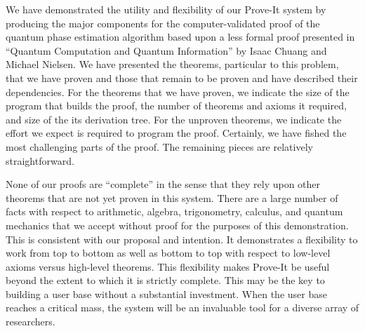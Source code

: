 \documentclass{article}[12pt]
\begin{document}
We have demonstrated the utility and flexibility of our Prove-It system by producing the major components for the computer-validated proof of the quantum phase estimation algorithm based upon a less formal proof presented in ``Quantum Computation and Quantum Information'' by Isaac Chuang and Michael Nielsen.  We have presented the theorems, particular to this problem, that we have proven and those that remain to be proven and have described their dependencies.  For the theorems that we have proven, we indicate the size of the program that builds the proof, the number of theorems and axioms it required, and size of the its derivation tree.  For the unproven theorems, we indicate the effort we expect is required to program the proof.  Certainly, we have fished the most challenging parts of the proof.  The remaining pieces are relatively straightforward.

None of our proofs are ``complete'' in the sense that they rely upon other theorems that are not yet proven in this system.  There are a large number of facts with respect to arithmetic, algebra, trigonometry, calculus, and quantum mechanics that we accept without proof for the purposes of this demonstration.  This is consistent with our proposal and intention.  It demonstrates a flexibility to work from top to bottom as well as bottom to top with respect to low-level axioms versus high-level theorems.  This flexibility makes Prove-It be useful beyond the extent to which it is strictly complete.  This may be the key to building a user base without a substantial investment.  When the user base reaches a critical mass, the system will be an invaluable tool for a diverse array of researchers.
\end{document}
